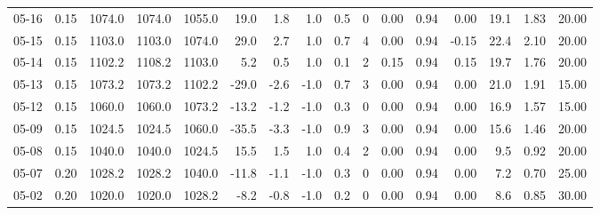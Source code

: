 \begin{threeparttable}
{\begin{tabular}{lrrrrrrrrrrrrrrr}
  05-16 &     0.15 & 1074.0 & 1074.0 & 1055.0 &       19.0 &            1.8 &                      1.0 &                 0.5 &              0 &       0.00 &      0.94 &           0.00 &             19.1 &            1.83 &                  20.00 \\
  05-15 &     0.15 & 1103.0 & 1103.0 & 1074.0 &       29.0 &            2.7 &                      1.0 &                 0.7 &              4 &       0.00 &      0.94 &          -0.15 &             22.4 &            2.10 &                  20.00 \\
  05-14 &     0.15 & 1102.2 & 1108.2 & 1103.0 &        5.2 &            0.5 &                      1.0 &                 0.1 &              2 &       0.15 &      0.94 &           0.15 &             19.7 &            1.76 &                  20.00 \\
  05-13 &     0.15 & 1073.2 & 1073.2 & 1102.2 &      -29.0 &           -2.6 &                     -1.0 &                 0.7 &              3 &       0.00 &      0.94 &           0.00 &             21.0 &            1.91 &                  15.00 \\
  05-12 &     0.15 & 1060.0 & 1060.0 & 1073.2 &      -13.2 &           -1.2 &                     -1.0 &                 0.3 &              0 &       0.00 &      0.94 &           0.00 &             16.9 &            1.57 &                  15.00 \\
  05-09 &     0.15 & 1024.5 & 1024.5 & 1060.0 &      -35.5 &           -3.3 &                     -1.0 &                 0.9 &              3 &       0.00 &      0.94 &           0.00 &             15.6 &            1.46 &                  20.00 \\
  05-08 &     0.15 & 1040.0 & 1040.0 & 1024.5 &       15.5 &            1.5 &                      1.0 &                 0.4 &              2 &       0.00 &      0.94 &           0.00 &              9.5 &            0.92 &                  20.00 \\
  05-07 &     0.20 & 1028.2 & 1028.2 & 1040.0 &      -11.8 &           -1.1 &                     -1.0 &                 0.3 &              0 &       0.00 &      0.94 &           0.00 &              7.2 &            0.70 &                  25.00 \\
  05-02 &     0.20 & 1020.0 & 1020.0 & 1028.2 &       -8.2 &           -0.8 &                     -1.0 &                 0.2 &              0 &       0.00 &      0.94 &           0.00 &              8.6 &            0.85 &                  30.00 \\

\end{tabular}}
\end{threeparttable}
